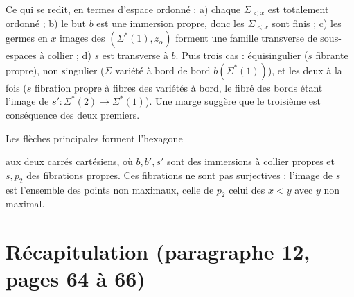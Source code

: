 \documentclass[11pt,a4paper]{article}
\begin{document}
Ce qui se redit, en termes d'espace ordonné : a) chaque $\Sigma_{<x}$ est totalement
ordonné ; b) le but $b$ est une immersion propre, donc les $\Sigma_{<x}$ sont finis ;
c) les germes en $x$ images des $(\Sigma^{*}(1), z_\alpha)$ forment une famille
transverse de sous-espaces à collier ; d) $s$ est transverse à $b$. Puis trois cas :
équisingulier ($s$ fibrante propre), non singulier ($\Sigma$ variété à bord de bord
$b(\Sigma^{*}(1))$), et les deux à la fois ($s$ fibration propre à fibres des variétés
à bord, le fibré des bords étant l'image de $s' : \Sigma^{*}(2) \to \Sigma^{*}(1)$).
Une marge suggère que le troisième est conséquence des deux premiers.

Les flèches principales forment l'hexagone


aux deux carrés cartésiens, où $b, b', s'$ sont des immersions à collier propres et
$s, p_2$ des fibrations propres. Ces fibrations ne sont pas surjectives : l'image de
$s$ est l'ensemble des points non maximaux, celle de $p_2$ celui des $x<y$ avec $y$
non maximal.

\section*{Récapitulation (paragraphe 12, pages 64 à 66)}
\end{document}
